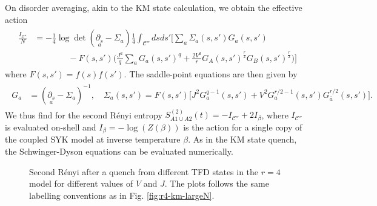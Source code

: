 \documentclass[reprint, floatfix,eqsecnum,superscriptaddress,preprint,nofootinbib,onecolumn,amsmath,amssymb,aps,prb]{revtex4-2}
\begin{document}
 
On disorder averaging, akin to the KM state calculation, we obtain the effective action
\begin{align}
    \begin{split}
	\frac{I_{\mathcal{C}''}}{N} &=  -\frac{1}{4} \log \det \left(  \underset{a}{\partial_s} - \Sigma_{a}  \right) \frac{1}{4}\int_{\mathcal{C}''} ds ds'  \Bigg[ \sum_{a} \Sigma_{a}(s,s') G_{a}(s,s') \\
	&\qquad\qquad - F(s,s')  \Bigg( \frac{J^2}{q} \sum_{a} G_{a}(s,s')^q + \frac{2V^2}{r} G_A(s,s')^{\frac{r}{2}} G_B(s,s')^{\frac{r}{2}} \Bigg) \Bigg] \end{split}
	\label{eqn:tfd-action}
\end{align}
where $F(s,s') = f(s) f(s')$. 
The saddle-point equations are then given by
\begin{align}
    \begin{split}
	G_a &= (\underset{a}{\partial_s} - \Sigma_{a})^{-1} , \quad 	\Sigma_a(s,s') = F(s,s') \Big[J^2 G_a^{q-1}(s,s')  + V^2 G_a^{r/2-1}(s,s') G_{\bar{a}}^{r/2}(s,s')\Big] .
	\end{split} \label{eqn:tfd-sd-eqns} 
\end{align}
We thus find for the second R\'enyi entropy
    $S^{(2)}_{A1\cup A2}(t) = -I_{\mathcal{C}''} + 2I_\beta$,
where $I_{\mathcal{C}''}$ is evaluated on-shell and $I_\beta = -\log(Z(\beta))$ is the action for a single copy of the coupled SYK model at inverse temperature $\beta$. As in the KM state quench, the Schwinger-Dyson equations can be evaluated numerically. 

\begin{figure}%
  \caption{Second R\'enyi after a quench from different TFD states in the $r=4$ model for different values of $V$ and $J$. The plots follows the same labelling conventions as in Fig. \ref{fig:r4-km-largeN}.  
  } 
  \label{fig:r4-tfd-largeN}
\end{figure}
\end{document}
